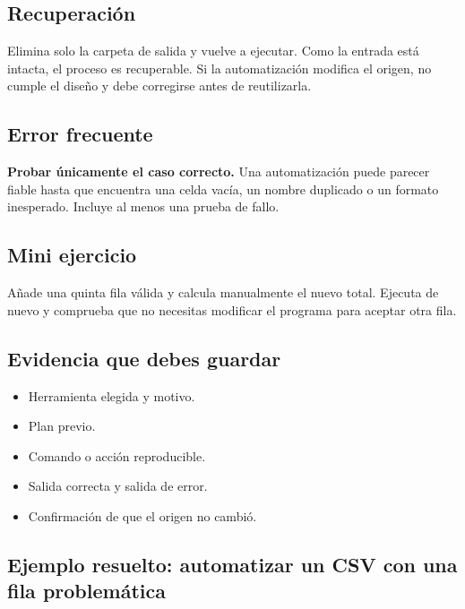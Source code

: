 \documentclass[10pt,a4paper,openany]{book}
\providecommand{\tightlist}{\setlength{\itemsep}{0.18em}\setlength{\parskip}{0pt}}
\begin{document}
\subsection{Recuperación}\label{recuperaciuxf3n-9}

Elimina solo la carpeta de salida y vuelve a ejecutar. Como la entrada
está intacta, el proceso es recuperable. Si la automatización modifica
el origen, no cumple el diseño y debe corregirse antes de reutilizarla.

\subsection{Error frecuente}\label{error-frecuente-11}

\textbf{Probar únicamente el caso correcto.} Una automatización puede
parecer fiable hasta que encuentra una celda vacía, un nombre duplicado
o un formato inesperado. Incluye al menos una prueba de fallo.

\subsection{Mini ejercicio}\label{mini-ejercicio-7}

Añade una quinta fila válida y calcula manualmente el nuevo total.
Ejecuta de nuevo y comprueba que no necesitas modificar el programa para
aceptar otra fila.

\subsection{Evidencia que debes
guardar}\label{evidencia-que-debes-guardar-11}

\begin{itemize}
\tightlist
\item
  Herramienta elegida y motivo.
\item
  Plan previo.
\item
  Comando o acción reproducible.
\item
  Salida correcta y salida de error.
\item
  Confirmación de que el origen no cambió.
\end{itemize}

\subsection{Ejemplo resuelto: automatizar un CSV con una fila
problemática}\label{ejemplo-resuelto-automatizar-un-csv-con-una-fila-problemuxe1tica}
\end{document}
